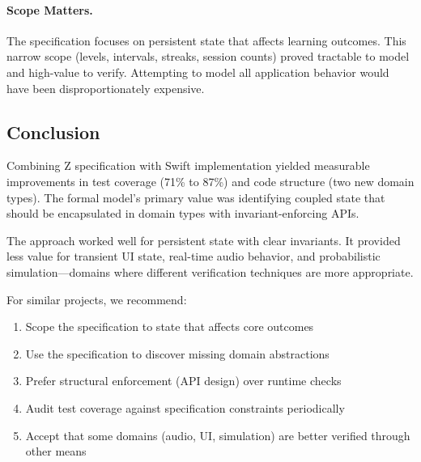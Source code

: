 \documentclass[a4paper,10pt,fleqn]{article}
\begin{document}
\paragraph{Scope Matters.}
The specification focuses on persistent state that affects learning outcomes.
This narrow scope (levels, intervals, streaks, session counts) proved
tractable to model and high-value to verify. Attempting to model all
application behavior would have been disproportionately expensive.

\subsection{Conclusion}

Combining Z specification with Swift implementation yielded measurable
improvements in test coverage (71\% to 87\%) and code structure (two new
domain types). The formal model's primary value was identifying coupled state
that should be encapsulated in domain types with invariant-enforcing APIs.

The approach worked well for persistent state with clear invariants. It
provided less value for transient UI state, real-time audio behavior, and
probabilistic simulation---domains where different verification techniques
are more appropriate.

For similar projects, we recommend:
\begin{enumerate}
\item Scope the specification to state that affects core outcomes
\item Use the specification to discover missing domain abstractions
\item Prefer structural enforcement (API design) over runtime checks
\item Audit test coverage against specification constraints periodically
\item Accept that some domains (audio, UI, simulation) are better verified
      through other means
\end{enumerate}
\end{document}
